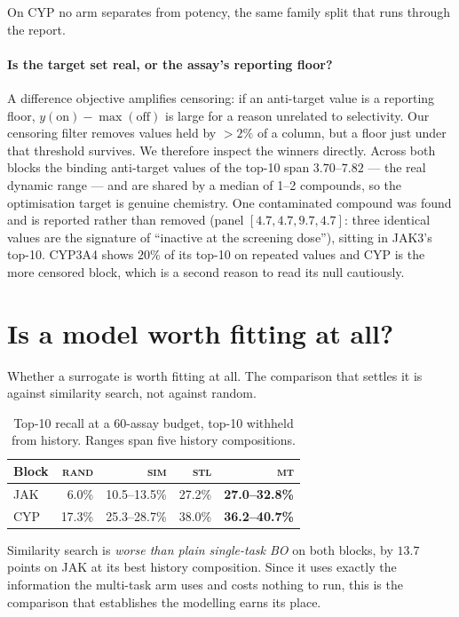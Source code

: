 \documentclass[11pt]{article}
\newcommand{\stl}{\textsc{stl}}
\newcommand{\mt}{\textsc{mt}}
\newcommand{\simarm}{\textsc{sim}}
\newcommand{\rnd}{\textsc{rand}}
\begin{document}
On CYP no arm separates from potency, the same family split that runs through
the report.

\paragraph{Is the target set real, or the assay's reporting floor?} A difference
objective amplifies censoring: if an anti-target value is a reporting floor,
$y(\text{on}) - \max(\text{off})$ is large for a reason unrelated to
selectivity. Our censoring filter removes values held by $>2\%$ of a column, but
a floor just under that threshold survives. We therefore inspect the winners
directly. Across both blocks the binding anti-target values of the top-10 span
$3.70$--$7.82$ --- the real dynamic range --- and are shared by a median of
1--2 compounds, so the optimisation target is genuine chemistry. One
contaminated compound was found and is reported rather than removed (panel
$[4.7, 4.7, 9.7, 4.7]$: three identical values are the signature of ``inactive
at the screening dose''), sitting in JAK3's top-10. CYP3A4 shows $20\%$ of its
top-10 on repeated values and CYP is the more censored block, which is a second
reason to read its null cautiously.

\section{Is a model worth fitting at all?}

Whether a surrogate is worth fitting at all. The comparison that settles it is
against similarity search, not against random.


\begin{table}[ht]
\centering\small
\begin{tabular}{lrrrr}
\toprule
Block & \rnd{} & \simarm{} & \stl{} & \mt{} \\
\midrule
JAK & 6.0\% & 10.5--13.5\% & 27.2\% & \textbf{27.0--32.8\%} \\
CYP & 17.3\% & 25.3--28.7\% & 38.0\% & \textbf{36.2--40.7\%} \\
\bottomrule
\end{tabular}
\caption{Top-10 recall at a 60-assay budget, top-10 withheld from history.
Ranges span five history compositions.}
\label{tab:baselines}
\end{table}

Similarity search is \emph{worse than plain single-task BO} on both blocks, by
$13.7$ points on JAK at its best history composition. Since it uses exactly the
information the multi-task arm uses
and costs nothing to run, this is the comparison that establishes the modelling
earns its place.
\end{document}
